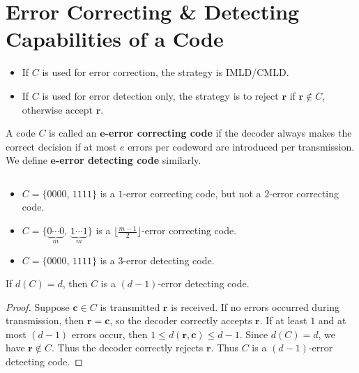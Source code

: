 
\section{Error Correcting \& Detecting Capabilities of a Code}
\begin{itemize}
    \item If $ C $ is used for error correction, the strategy is IMLD/CMLD\@.
    \item If $ C $ is used for error detection only, the strategy is
          to reject $ \bm{r} $ if $ \bm{r}\notin C $, otherwise accept $ \bm{r} $.
\end{itemize}
\begin{defbox}
    \begin{definition}
        A code $ C $ is called an \textbf{$\bm{e}$-error correcting code}
        if the decoder always makes the correct decision if
        at most $ e $ errors per codeword are introduced per transmission.
        We define \textbf{$\bm{e}$-error detecting code} similarly.
    \end{definition} \end{defbox}

\begin{exbox}
    \begin{example}$\;$
        \begin{itemize}
            \item $ C=\{0000,\,1111\} $ is a $ 1 $-error correcting code, but not a
                  $ 2 $-error correcting code.
            \item $ C=\{\underbrace{0\cdots 0}_{m},\,\underbrace{1\cdots 1}_{m}\} $
                  is a $ \lfloor \frac{m-1}{2} \rfloor $-error correcting code.
            \item $ C=\{0000,\,1111\} $ is a $ 3 $-error detecting code.
        \end{itemize}
    \end{example}
\end{exbox}

\begin{thmbox}
    \begin{theorem}
        If $ d(C)=d $, then $ C $ is a $ (d-1) $-error detecting code.
    \end{theorem} \end{thmbox}

\begin{proof}
    Suppose $ \bm{c}\in C $ is transmitted $ \bm{r} $ is received. If no
    errors occurred during transmission, then $ \bm{r}=\bm{c} $,
    so the decoder correctly accepts $ \bm{r} $. If at least $ 1 $
    and at most $ (d-1) $ errors occur, then
    $ 1\leqslant d(\bm{r},\bm{c})\leqslant d-1 $. Since $ d(C)=d $,
    we have $ \bm{r}\notin C $. Thus the decoder correctly rejects
    $ \bm{r} $. Thus $ C $ is a $ (d-1) $-error detecting code.
\end{proof}

